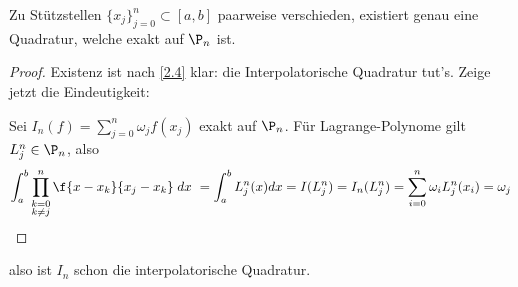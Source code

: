 \documentclass[11pt]{scrartcl}
\begin{document}
\begin{st}
	\label{2.5}
	Zu Stützstellen $\{x_j\}_{j=0}^n \subset [a,b]$ paarweise verschieden, existiert genau eine Quadratur, welche exakt auf $\P_n$ ist.
	\begin{proof}
		Existenz ist nach \ref{2.4} klar: die Interpolatorische Quadratur tut's.
		Zeige jetzt die Eindeutigkeit:

		Sei $I_n(f) = \sum_{j=0}^n \omega_j f(x_j)$ exakt auf $\P_n$.
		Für Lagrange-Polynome gilt $L_j^n \in \P_n$, also
		\[
			\int_{a}^b \prod_{\substack{k=0\\k\neq j}}^n \f {x-x_k}{x_j-x_k} \; dx \\\
			= \int_a^b L_j^n (x) dx = I(L_j^n) = I_n(L_j^n) = \sum_{i=0}^n \omega_i L_j^n(x_i) = \omega_j
		\]
	\end{proof}
	also ist $I_n$ schon die interpolatorische Quadratur.
\end{st}
\end{document}
